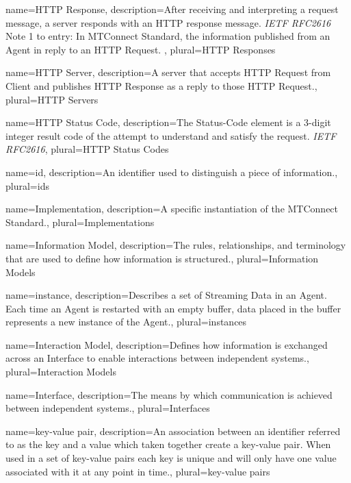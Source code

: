 {
    name={HTTP Response},
	description={After receiving and interpreting a request message, a server responds with an HTTP response message. \textit{IETF RFC2616}
Note 1 to entry: In MTConnect Standard, the information published from an \gls{Agent} in reply to an \gls{HTTP Request}. },
	plural={HTTP Responses}
}

{
    name={HTTP Server},
	description={A server that accepts \gls{HTTP Request} from \gls{Client} and publishes \gls{HTTP Response} as a reply to those \gls{HTTP Request}.},
	plural={HTTP Servers}
}

{
    name={HTTP Status Code},
	description={The Status-Code element is a 3-digit integer result code of the attempt to understand and satisfy the request.  \textit{IETF RFC2616}},
	plural={HTTP Status Codes}
}

{
    name={id},
	description={An identifier used to distinguish a piece of information.},
	plural={ids}
}

{
    name={Implementation},
	description={A specific instantiation of the MTConnect Standard.},
	plural={Implementations}
}

{
    name={Information Model},
	description={The rules, relationships, and terminology that are used to define how information is structured.},
	plural={Information Models}
}

{
    name={instance},
	description={Describes a set of \gls{Streaming Data} in an \gls{Agent}.  Each time an \gls{Agent} is restarted with an empty \gls{buffer}, data placed in the \gls{buffer} represents a new \gls{instance} of the \gls{Agent}.},
	plural={instances}
}

{
    name={Interaction Model},
	description={Defines how information is exchanged across an \gls{Interface} to enable interactions between independent systems.},
	plural={Interaction Models}
}

{
    name={Interface},
	description={The means by which communication is achieved between independent systems.},
	plural={Interfaces}
}

{
    name={key-value pair},
	description={An association between an identifier referred to as the \gls{key} and a value which taken together create a \gls{key-value pair}. When used in a set of \glspl{key-value pair} each \gls{key} is unique and will only have one value associated with it at any point in time.},
	plural={key-value pairs}
}

